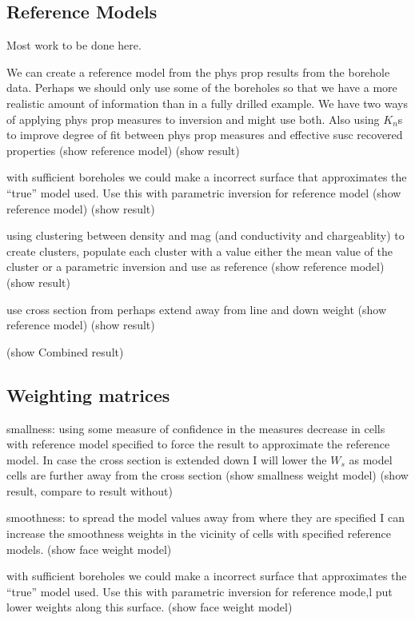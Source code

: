 \subsection{Reference Models}
\label{sec:Reference Models:TKC}

Most work to be done here. 

We can create a reference model from the phys prop results from the borehole data. Perhaps we should only use some of the boreholes so that we have a more realistic amount of information than in a fully drilled example. We have two ways of applying phys prop measures to inversion and might use both. Also using $K_n$s to improve degree of fit between phys prop measures and effective susc recovered properties
(show reference model)
(show result)

with sufficient boreholes we could make a incorrect surface that approximates the ``true'' model used. Use this with parametric inversion for reference model
(show reference model)
(show result)

using clustering between density and mag (and conductivity and chargeablity) to create clusters, populate each cluster with a value either the mean value of the cluster or a parametric inversion and use as reference
(show reference model)
(show result)

use cross section from \cite{harder2006geologyTKC}
perhaps extend away from line and down weight
(show reference model)
(show result)

(show Combined result)

\subsection{Weighting matrices}
\label{sec:Weighting matrices:TKC}

smallness: using some measure of confidence in the measures decrease in cells with reference model specified to force the result to approximate the reference model. In case the cross section is extended down I will lower the $W_s$ as model cells are further away from the cross section
(show smallness weight model)
(show result, compare to result without)

smoothness: to spread the model values away from where they are specified I can increase the smoothness weights in the vicinity of cells with specified reference models. 
(show face weight model)

with sufficient boreholes we could make a incorrect surface that approximates the ``true'' model used. Use this with parametric inversion for reference mode,l put lower weights along this surface.
(show face weight model)

